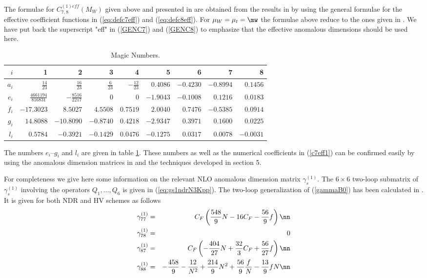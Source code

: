 The formulae for $C_{7,8}^{(1)eff}(M_W)$ given above and presented in 
\cite{CZMM} are obtained from
the results in \cite{Yao1,GH97,BKP2,GAMB} by using the general formulae 
for the effective coefficient functions in (\ref{eq:defc7eff}) and
(\ref{eq:defc8eff}). For $\mu_W=\mu_t=\mw$ the formulae above 
reduce to the ones given
in \cite{CZMM}. We have put back the superscript "eff" in
(\ref{GENC7}) and (\ref{GENC8}) to emphasize that the effective
anomalous dimensions should be used here.

\begin{table}[htb]
\caption[]{Magic Numbers.
\label{tab:akh1}}
\begin{center}
\begin{tabular}{|r|r|r|r|r|r|r|r|r|}
\hline
$i$ & 1 & 2 & 3 & 4 & 5 & 6 & 7 & 8 \\
\hline
$a_i $&$ \frac{14}{23} $&$ \frac{16}{23} $&$ \frac{6}{23} $&$
-\frac{12}{23} $&$
0.4086 $&$ -0.4230 $&$ -0.8994 $&$ 0.1456 $\\
$e_i$ &$\frac{4661194}{816831}$&$ -\frac{8516}{2217}$ &$  0$ &$  0$ 
        & $ -1.9043$  & $  -0.1008$ & $ 0.1216$  &$ 0.0183$\\
$f_i$ & $-17.3023$ & $8.5027 $ & $ 4.5508$  & $ 0.7519$
        & $  2.0040 $ & $  0.7476$  &$ -0.5385$  & $ 0.0914$\\
$g_i$ & $14.8088$ &  $ -10.8090$  &$ -0.8740$  & $ 0.4218$ 
        & $  -2.9347$   & $ 0.3971$  & $ 0.1600$  & $ 0.0225$ \\
$l_i$ & $0.5784$ &  $ -0.3921$  &$ -0.1429$  & $ 0.0476$ 
        & $  -0.1275$   & $ 0.0317$  & $ 0.0078$  & $ -0.0031$ \\
\hline
\end{tabular}
\end{center}
\end{table}

The numbers $e_i$--$g_i$ and $l_i$ are given in table \ref{tab:akh1}. 
These  numbers as well as the numerical coefficients
in (\ref{c7eff1}) can be confirmed easily by using the anomalous dimension 
matrices  in \cite{CZMM} and the techniques developed in section 5. 

For completeness we give here some information on the relevant
NLO anomalous dimension matrix $\gamma^{(1)}_s$.
The $6\times 6$ two-loop submatrix of $\gamma^{(1)}_s$ involving
the operators $Q_1,\ldots,Q_6$ is given in (\ref{eq:gs1ndrN3Kpp}).
The two-loop generalization of (\ref{gammaB0}) has been calculated 
in \cite{MisMu:94}. It is given for both NDR and HV
schemes as follows
\begin{eqnarray}
\gamma^{(1)}_{77} &=& 
   C_F \left(\frac{548}{9} N - 16 C_F - \frac{56}{9} f \right)
\nn \\
\gamma^{(1)}_{78} &=& 0
\label{gammaB1} \\
\gamma^{(1)}_{87} &=& 
   C_F \left(-\frac{404}{27} N +\frac{32}{3} C_F +\frac{56}{27} f \right)
\nn \\
\gamma^{(1)}_{88} &=& -\frac{458}{9} -\frac{12}{N^2}+ \frac{214}{9} N^2 +
   \frac{56}{9} \frac{f}{N} - \frac{13}{9} f N
\nn
\end{eqnarray}

